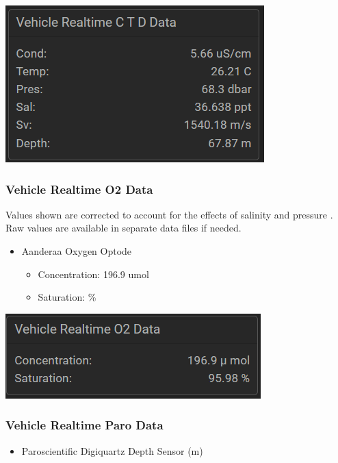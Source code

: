 \documentclass[
  letterpaper,
  DIV=11,
  numbers=noendperiod]{scrreprt}
\providecommand{\tightlist}{%
  \setlength{\itemsep}{0pt}\setlength{\parskip}{0pt}}\usepackage{longtable,booktabs,array}
\begin{document}
\includegraphics{images/image33.png}

\hypertarget{vehicle-realtime-o2-data}{%
\subsubsection{Vehicle Realtime O2
Data}\label{vehicle-realtime-o2-data}}

Values shown are corrected to account for the effects of salinity and
pressure . Raw values are available in separate data files if needed.

\begin{itemize}
\tightlist
\item
  Aanderaa Oxygen Optode

  \begin{itemize}
  \tightlist
  \item
    Concentration: 196.9 umol
  \item
    Saturation: \%
  \end{itemize}
\end{itemize}

\includegraphics{images/image30.png}

\hypertarget{vehicle-realtime-paro-data}{%
\subsubsection{Vehicle Realtime Paro
Data}\label{vehicle-realtime-paro-data}}

\begin{itemize}
\tightlist
\item
  Paroscientific Digiquartz Depth Sensor (m)
\end{itemize}
\end{document}
